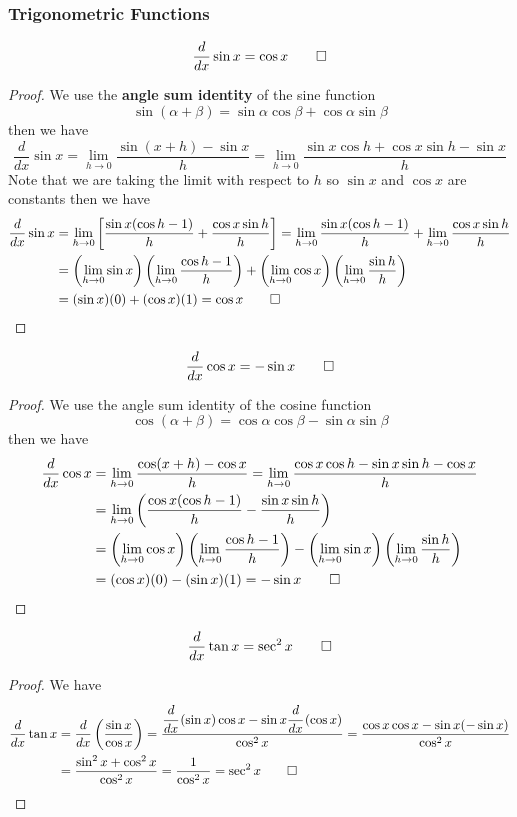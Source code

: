 \subsubsection{Trigonometric Functions}
\begin{theorem}
    \[\frac{d}{dx}\sin x=\cos x\qedhere\]
\end{theorem}
\begin{proof}
    We use the \textbf{angle sum identity} of the sine function
    \[\sin(\alpha+\beta)=\sin\alpha\cos\beta+\cos\alpha\sin\beta\] then we have
    \[\frac{d}{dx}\sin x=\lim_{h\to 0}\frac{\sin(x+h)-\sin x}{h}
    =\lim_{h\to 0}\frac{\sin x\cos h+\cos x\sin h-\sin x}{h}\]
    Note that we are taking the limit with respect to \(h\) so \(\sin x\) and
    \(\cos x\) are constants then we have
    \begin{align*}
        \frac{d}{dx}\sin x
        &=\lim_{h\to 0}\left[\frac{\sin x(\cos h-1)}{h}+\frac{\cos x\sin h}{h}\right]
        =\lim_{h\to 0}\frac{\sin x(\cos h-1)}{h}+\lim_{h\to 0}\frac{\cos x\sin h}{h} \\
        &=\left(\lim_{h\to 0}\sin x\right)\left(\lim_{h\to 0}\frac{\cos h-1}{h}\right)
        +\left(\lim_{h\to 0}\cos x\right)\left(\lim_{h\to 0}\frac{\sin h}{h}\right) \\
        &=(\sin x)(0)+(\cos x)(1) =\cos x\qedhere
    \end{align*}
\end{proof}
\begin{theorem}
    \[\frac{d}{dx}\cos x=-\sin x\qedhere\]
\end{theorem}
\begin{proof}
    We use the angle sum identity of the cosine function
    \[\cos(\alpha+\beta)=\cos\alpha\cos\beta-\sin\alpha\sin\beta\] then we have
    \begin{align*}
        \frac{d}{dx}\cos x&=\lim_{h\to 0}\frac{\cos(x+h)-\cos x}{h}
        =\lim_{h\to 0}\frac{\cos x\cos h-\sin x\sin h-\cos x}{h} \\
        &=\lim_{h\to 0}\left(\frac{\cos x(\cos h-1)}{h}-\frac{\sin x\sin h}{h}\right) \\
        &=\left(\lim_{h\to 0}\cos x\right)\left(\lim_{h\to 0}\frac{\cos h-1}{h}\right)
        -\left(\lim_{h\to 0}\sin x\right)\left(\lim_{h\to 0}\frac{\sin h}{h}\right) \\
        &=(\cos x)(0)-(\sin x)(1)=-\sin x\qedhere
    \end{align*}
\end{proof}
\begin{theorem}
    \[\frac{d}{dx}\tan x=\sec^2 x\qedhere\]
\end{theorem}
\begin{proof}
    We have
    \begin{align*}
        \frac{d}{dx}\tan x&=\frac{d}{dx}\left(\frac{\sin x}{\cos x}\right)
        =\frac{\cfrac{d}{dx}\left(\sin x\right)\cos x
        -\sin x\cfrac{d}{dx}\left(\cos x\right)}{\cos^2 x}
        =\frac{\cos x\cos x-\sin x(-\sin x)}{\cos^2 x} \\
        &=\frac{\sin^2 x+\cos^2 x}{\cos^2 x}=\frac{1}{\cos^2 x}=\sec^2 x\qedhere
    \end{align*}
\end{proof}

